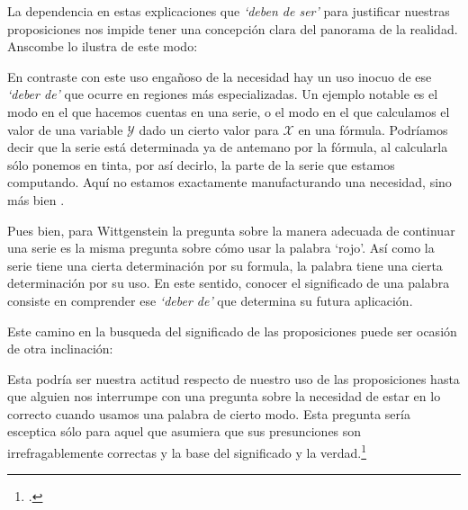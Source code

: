 La dependencia en estas explicaciones que \emph{`deben de ser'} para justificar
nuestras proposiciones nos impide tener una concepción clara del panorama de la
realidad. Anscombe lo ilustra de este modo:

En contraste con este uso engañoso de la necesidad hay un uso inocuo de ese
\emph{`deber de'} que ocurre en regiones más especializadas. Un ejemplo
notable es el modo en el que hacemos cuentas en una serie, o el modo en el que
calculamos el valor de una variable $\mathcal{Y}$ dado un cierto valor para
$\mathcal{X}$ en una fórmula. Podríamos decir que la serie está determinada ya
de antemano por la fórmula, al calcularla sólo ponemos en tinta, por así
decirlo, la parte de la serie que estamos computando. Aquí no estamos
exactamente manufacturando una necesidad, sino más bien
.

Pues bien, para Wittgenstein la pregunta sobre la manera adecuada de continuar
una serie es la misma pregunta sobre cómo usar la palabra `rojo'. Así como la
serie tiene una cierta determinación por su formula, la palabra tiene una cierta
determinación por su uso. En este sentido, conocer el significado de una palabra
consiste en comprender ese \emph{`deber de'} que determina su futura aplicación.

Este camino en la busqueda del significado de las proposiciones puede ser
ocasión de otra inclinación:

Esta podría ser nuestra actitud respecto de nuestro uso de las proposiciones
hasta que alguien nos interrumpe con una pregunta sobre la necesidad de estar en
lo correcto cuando usamos una palabra de cierto modo. Esta pregunta sería
esceptica sólo para aquel que asumiera que sus presunciones son
irrefragablemente correctas y la base del significado y la
verdad.\footcite[cfr.~][p.~186]{twocuts}

